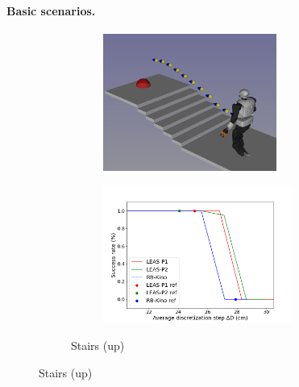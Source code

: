 

\paragraph{Basic scenarios.\label{subsub:mip:basic_scenarios}}
\begin{figure}[h!]
    \centering
    \captionsetup[subfigure]{justification=centering}
    \begin{subfigure}{0.9\linewidth}
        \centering
        \begin{subfigure}{0.48\linewidth}
            \includegraphics[trim={0cm 0cm 0cm 0cm},clip,width=\textwidth,height=4.5cm]{Figures/Chapter_MIP_SL1M/res_mip/scenario_stairs.png}
        \end{subfigure}
        \begin{subfigure}{0.48\linewidth}
            \includegraphics[trim={0cm 0cm 2cm 1.8cm}, clip,width=\textwidth,height=4.5cm]{Figures/Chapter_MIP_SL1M/res_mip/MIP_stairs/FIGURE_MIP_STAIRS_2.png}
        \end{subfigure}
        \caption{Stairs (up)}

\end{subfigure}
\end{figure}
